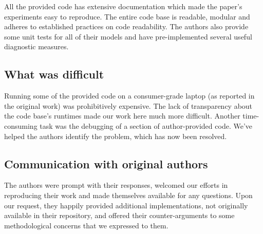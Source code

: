 All the provided code has extensive documentation which made the paper's experiments easy to reproduce. The entire code base is readable, modular and adheres to established practices on code readability. The authors also provide some unit tests for all of their models and have pre-implemented several useful diagnostic measures.


\subsection*{What was difficult}


Running some of the provided code on a consumer-grade laptop (as reported in the original work) was prohibitively expensive. The lack of transparency about the code base's runtimes made our work here much more difficult. Another time-consuming task was the debugging of a section of author-provided code. We've helped the authors identify the problem, which has now been resolved.

\subsection*{Communication with original authors}

The authors were prompt with their responses, welcomed our efforts in reproducing their work and made themselves available for any questions. Upon our request, they happily provided additional implementations, not originally available in their repository, and offered their counter-arguments to some methodological concerns that we expressed to them.
